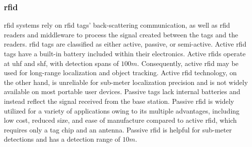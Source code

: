 \subsubsection{\acf{rfid}}
\acf{rfid} systems rely on \ac{rfid} tags' back-scattering communication, as well as \ac{rfid} readers and middleware to process the signal created between the tags and the readers\cite{tesoriero2010improving}.
\ac{rfid} tags are classified as either active, passive, or semi-active.
Active \ac{rfid} tags have a built-in battery included within their electronics.
Active \ac{rfid}s operate at \ac{uhf} and \ac{shf}, with detection spans of $100 m$.
Consequently, active \ac{rfid} may be used for long-range localization and object tracking\cite{deak2012survey}.
Active \ac{rfid} technology, on the other hand, is unreliable for sub-meter localization precision and is not widely available on most portable user devices.
Passive tags lack internal batteries and instead reflect the signal received from the base station.
Passive \ac{rfid} is widely utilized for a variety of applications owing to its multiple advantages, including low cost, reduced size, and ease of manufacture compared to active \ac{rfid}, which requires only a tag chip and an antenna.
Passive \ac{rfid} is helpful for sub-meter detections and has a detection range of $10 m$\cite{deak2012survey}.







